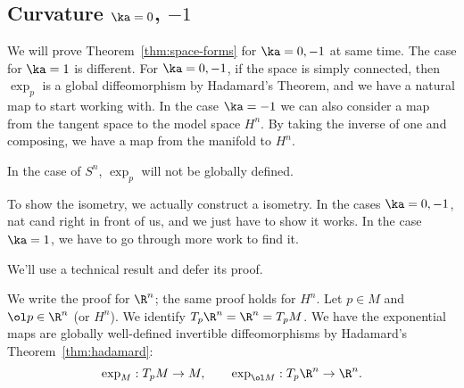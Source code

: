 \subsection{Curvature $\ka=0$, $-1$}
We will prove Theorem~\ref{thm:space-forms} for $\ka=0,-1$ at same time. The case for $\ka=1$ is different. For $\ka=0,-1$, if the space is simply connected, then $\exp_p$ is a global diffeomorphism by Hadamard's Theorem, and we have a natural map to start working with. In the case $\ka=-1$ we can also consider a map from the tangent space to the model space $H^n$. %
By taking the inverse of one and composing, we have a map from the manifold to $H^n$. 

In the case of $S^n$, $\exp_p$ will not be globally defined.

To show the isometry, we actually construct a isometry. In the cases $\ka=0,-1$, nat cand right in front of us, and we just have to show it works. In the case $\ka=1$, we have to go through more work to find it.

We'll use a technical result and defer its proof.

We write the proof for $\R^n$; the same proof holds for $H^n$. Let $p\in M$ and $\ol p\in \R^n$ (or $H^n$). We identify $T_p\R^n=\R^n=T_pM$. We have the exponential maps are globally well-defined invertible diffeomorphisms by Hadamard's Theorem~\ref{thm:hadamard}:
\[
\exp_M:T_pM\to M,\qquad \exp_{\ol M}: T_p\R^n\to \R^n.
\]

